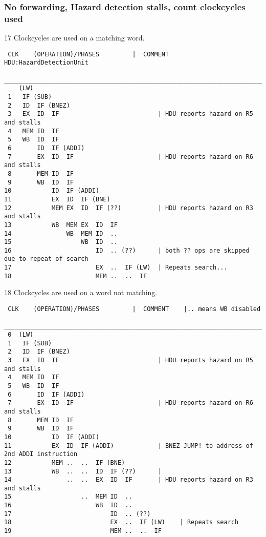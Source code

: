 \documentclass[a4paper,10pt]{article}
\begin{document}
\newpage
\subsubsection{No forwarding, Hazard detection stalls, count clockcycles used}

17 Clockcycles are used on a matching word.
\begin{verbatim}
 CLK    (OPERATION)/PHASES         |  COMMENT   HDU:HazardDetectionUnit
 ________________________________________________________________________________________________
    (LW)  
 1   IF (SUB)
 2   ID  IF (BNEZ) 
 3   EX  ID  IF                           | HDU reports hazard on R5 and stalls
 4   MEM ID  IF     
 5   WB  ID  IF 
 6       ID  IF (ADDI)
 7       EX  ID  IF                       | HDU reports hazard on R6 and stalls
 8       MEM ID  IF    
 9       WB  ID  IF  
10           ID  IF (ADDI)
11           EX  ID  IF (BNE)
12           MEM EX  ID  IF (??)          | HDU reports hazard on R3 and stalls
13           WB  MEM EX  ID  IF           
14               WB  MEM ID  ..   
15                   WB  ID  .. 
16                       ID  .. (??)      | both ?? ops are skipped due to repeat of search
17                       EX  ..  IF (LW)  | Repeats search...
18                       MEM ..  ..  IF   
\end{verbatim}



18 Clockcycles are used on a word not matching.
\begin{verbatim}
 CLK    (OPERATION)/PHASES         |  COMMENT    |.. means WB disabled
 ________________________________________________________________________________________________
 0  (LW)  
 1   IF (SUB)
 2   ID  IF (BNEZ) 
 3   EX  ID  IF                           | HDU reports hazard on R5 and stalls
 4   MEM ID  IF     
 5   WB  ID  IF 
 6       ID  IF (ADDI)
 7       EX  ID  IF                       | HDU reports hazard on R6 and stalls
 8       MEM ID  IF    
 9       WB  ID  IF  
10           ID  IF (ADDI)
11           EX  ID  IF (ADDI)            | BNEZ JUMP! to address of 2nd ADDI instruction
12           MEM ..  ..  IF (BNE)
13           WB  ..  ..  ID  IF (??)      | 
14               ..  ..  EX  ID  IF       | HDU reports hazard on R3 and stalls
15                   ..  MEM ID  ..  
16                       WB  ID  .. 
17                           ID  .. (??)
18                           EX  ..  IF (LW)    | Repeats search
19                           MEM ..  ..  IF
\end{verbatim}
\end{document}

